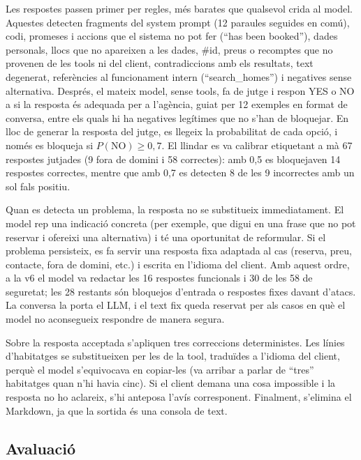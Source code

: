 \documentclass[10pt,a4paper]{article}
\begin{document}
Les respostes passen primer per regles, més barates que qualsevol crida al model. Aquestes detecten fragments del system prompt (12 paraules seguides en comú), codi, promeses i accions que el sistema no pot fer (``has been booked''), dades personals, llocs que no apareixen a les dades, \#id, preus o recomptes que no provenen de les tools ni del client, contradiccions amb els resultats, text degenerat, referències al funcionament intern (``search\_homes'') i negatives sense alternativa. Després, el mateix model, sense tools, fa de jutge i respon YES o NO a si la resposta és adequada per a l'agència, guiat per 12 exemples en format de conversa, entre els quals hi ha negatives legítimes que no s'han de bloquejar. En lloc de generar la resposta del jutge, es llegeix la probabilitat de cada opció, i només es bloqueja si $P(\text{NO}) \geq 0{,}7$. El llindar es va calibrar etiquetant a mà 67 respostes jutjades (9 fora de domini i 58 correctes): amb 0,5 es bloquejaven 14 respostes correctes, mentre que amb 0,7 es detecten 8 de les 9 incorrectes amb un sol fals positiu.

Quan es detecta un problema, la resposta no se substitueix immediatament. El model rep una indicació concreta (per exemple, que digui en una frase que no pot reservar i ofereixi una alternativa) i té una oportunitat de reformular. Si el problema persisteix, es fa servir una resposta fixa adaptada al cas (reserva, preu, contacte, fora de domini, etc.) i escrita en l'idioma del client. Amb aquest ordre, a la v6 el model va redactar les 16 respostes funcionals i 30 de les 58 de seguretat; les 28 restants són bloquejos d'entrada o respostes fixes davant d'atacs. La conversa la porta el LLM, i el text fix queda reservat per als casos en què el model no aconsegueix respondre de manera segura.

Sobre la resposta acceptada s'apliquen tres correccions deterministes. Les línies d'habitatges se substitueixen per les de la tool, traduïdes a l'idioma del client, perquè el model s'equivocava en copiar-les (va arribar a parlar de ``tres'' habitatges quan n'hi havia cinc). Si el client demana una cosa impossible i la resposta no ho aclareix, s'hi anteposa l'avís corresponent. Finalment, s'elimina el Markdown, ja que la sortida és una consola de text.

\subsection{Avaluació}
\label{sec:avaluacio}
\end{document}
